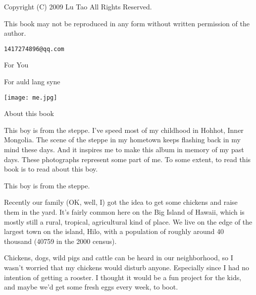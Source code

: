 %
%
% 
%

\vspace*{5in}
{\large Copyright (C) 2009 Lu Tao  All Rights Reserved.}

This book may not be reproduced in any form without written permission
of the author. 

{\tt 1417274896@qq.com}
\newpage

\vspace*{2in}
\begin{center}
{\LARGE For You}

{\large For auld lang syne}

\vspace*{0.5in}

\texttt{[image: me.jpg]}
\end{center}
\newpage

\vspace*{1in}
{\LARGE About this book}

This boy is from the steppe.
I've speed most of my childhood in Hohhot, Inner Mongolia. 
The scene of the steppe in my hometown keeps flashing back in my mind these days.  
And it inspires me to make this album in memory of my past days.
These photographs represent some part of me. 
To some extent, to read this book is to read about this boy.

\vspace*{0.25in}

{\LARGE This boy is from the steppe.}

Recently our family (OK, well, I) got the idea to get some chickens and
raise them in the yard. It's fairly common here on the Big Island of
Hawaii, which is mostly still a rural, tropical, agricultural kind of
place. We live on the edge of the largest town on the island, Hilo, with
a population of roughly around 40 thousand (40759 in the 2000 census).

Chickens, dogs, wild pigs and cattle can be heard in our neighborhood,
so I wasn't worried that my chickens would disturb anyone. Especially
since I had no intention of getting a rooster. I thought it would be a
fun project for the kids, and maybe we'd get some fresh eggs every week,
to boot. 

